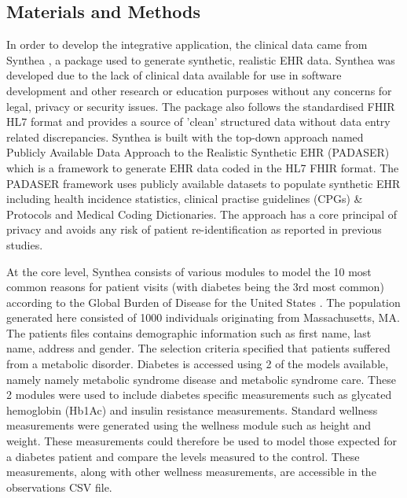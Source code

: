 \documentclass{bioinfo}
\begin{document}
\begin{methods}
\section{Materials and Methods}
In order to develop the integrative application, the clinical data came from Synthea \citep{Synthea}, a package used to generate synthetic, realistic EHR data. Synthea was developed due to the lack of clinical data available for use in software development and other research or education purposes without any concerns for legal, privacy or security issues. The package also follows the standardised FHIR HL7 format and provides a source of 'clean' structured data without data entry related discrepancies. Synthea is built with the top-down approach named Publicly Available Data Approach to the Realistic Synthetic EHR (PADASER) which is a framework to generate EHR data coded in the HL7 FHIR format. The PADASER framework uses publicly available datasets to populate synthetic EHR including health incidence statistics, clinical practise guidelines (CPGs) & Protocols and Medical Coding Dictionaries. The approach has a core principal of privacy and avoids any risk of patient re-identification as reported \citep{ElEmam2011} in previous studies.  

At the core level, Synthea consists of various modules to model the 10 most common reasons for patient visits (with diabetes being the 3rd most common) according to the Global Burden of Disease for the United States \citep{Synthea}. The population generated here consisted of 1000 individuals originating from Massachusetts, MA. The patients files contains demographic information such as first name, last name, address and gender. The selection criteria specified that patients suffered from a metabolic disorder. Diabetes is accessed using 2 of the models available, namely namely metabolic syndrome disease and metabolic syndrome care. These 2 modules were used to include diabetes specific measurements such as glycated hemoglobin (Hb1Ac) and insulin resistance measurements. Standard wellness measurements were generated using the wellness module such as height and weight. These measurements could therefore be used to model those expected for a diabetes patient and compare the levels measured to the control. These measurements, along with other wellness measurements, are accessible in the observations CSV file. 


\end{methods}
\end{document}
